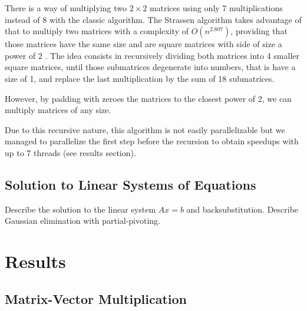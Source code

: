 \documentclass{dependencies/acm_proc_article-sp}
\begin{document}
There is a way of multiplying two $2\times2$ matrices using only 7 multiplications instead of 8 with the classic algorithm. The Strassen algorithm takes advantage of that to multiply two matrices with a complexity of $O(n^2.807)$, providing that those matrices have the same size and are square matrices with side of size a power of 2 \cite{StrassenAlgorithm}.
The idea consists in recursively dividing both matrices into 4 smaller square matrices, until those submatrices degenerate into numbers, that is have a size of 1, and replace the last multiplication by the sum of 18 submatrices.

However, by padding with zeroes the matrices to the closest power of 2, we can multiply matrices of any size. 

Due to this recursive nature, this algorithm is not easily parallelizable but we managed to parallelize the first step before the recursion to obtain speedups with up to 7 threads (see results section).

\subsection{Solution to Linear Systems of Equations}

Describe the solution to the linear system $Ax=b$ and backsubstitution. Describe Gaussian elimination with partial-pivoting.

\section{Results}
\subsection{Matrix-Vector Multiplication}
\end{document}
